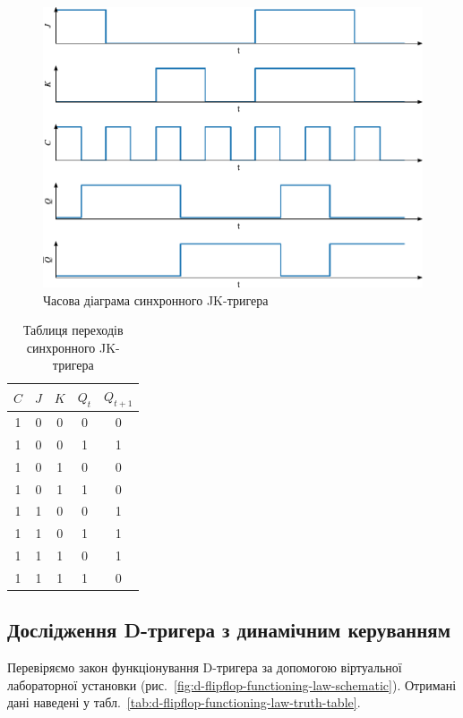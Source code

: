 \documentclass[a4paper,oneside,DIV=10,12pt]{scrartcl}
\begin{document}
			\begin{figure}[!htbp]
			\centering
				\includegraphics[width = \textwidth]{plots/02-pdf/03-jkc-edited.pdf}
			\caption{Часова діаграма синхронного JK-тригера}
			\label{fig:jk-sync-flipflop-dynamic-mode-time-diagram}
			\end{figure}
			
			\begin{table}[!htbp]
			\centering
			\caption{Таблиця переходів синхронного JK-тригера}
				\begin{tabular}{ccccc}
					\toprule
						$C$ & $J$ & $K$ & $Q_t$ & $Q_{t + 1}$ \\
					\midrule
						1 & 0 & 0 & 0 & 0 \\
						1 & 0 & 0 & 1 & 1 \\
						1 & 0 & 1 & 0 & 0 \\
						1 & 0 & 1 & 1 & 0 \\
						1 & 1 & 0 & 0 & 1 \\
						1 & 1 & 0 & 1 & 1 \\
						1 & 1 & 1 & 0 & 1 \\
						1 & 1 & 1 & 1 & 0 \\
					\bottomrule
				\end{tabular}
			\label{tab:jk-sync-flipflop-dynamic-mode-truth-table}
			\end{table}
			
		\subsection{Дослідження D-тригера з динамічним керуванням}
			Перевіряємо закон функціонування D-тригера за допомогою віртуальної лабораторної установки (рис.~\ref{fig:d-flipflop-functioning-law-schematic}). Отримані дані наведені у табл.~\ref{tab:d-flipflop-functioning-law-truth-table}.
			
\end{document}
